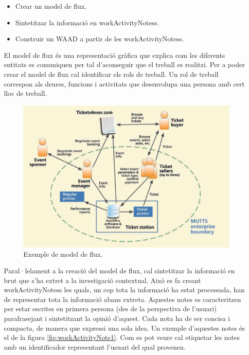 \begin{itemize}
\item Crear un model de flux.
\item Sintetitzar la informació en \glspl{workActivityNotes}.
\item Construir un \ac{WAAD} a partir de les \glspl{workActivityNotes}.
\end{itemize}

El model de flux és una representació gràfica que explica com les diferents entitats es comuniquen per tal d'aconseguir que el treball es realitzi. Per a poder crear el model de flux cal identificar els rols de treball. Un rol de treball correspon als deures, funcions i activitats que desenvolupa una persona amb cert lloc de treball.

\begin{figure}[htp]
\centering
\includegraphics[scale=0.6]{flow_model_example.png}
\caption{Exemple de model de flux.}\label{fig:flow_model_example}
\end{figure}

Paral·lelament a la creació del model de flux, cal sintetitzar la informació en brut que s'ha extret a la investigació contextual. Això es fa creant \glspl{workActivityNotes} les quals, un cop tota la informació ha estat processada, han de representar tota la informació abans extreta. Aquestes notes es caracteritzen per estar escrites en primera persona (des de la perspectiva de l'usuari) parafrasejant i sintetitzant la opinió d'aquest. Cada nota ha de ser concisa i compacta, de manera que expressi una sola idea. Un exemple d'aquestes notes és el de la figura \ref{fig:workActivityNote1}. Com es pot veure cal etiquetar les notes amb un identificador representant l'usuari del qual provenen.

